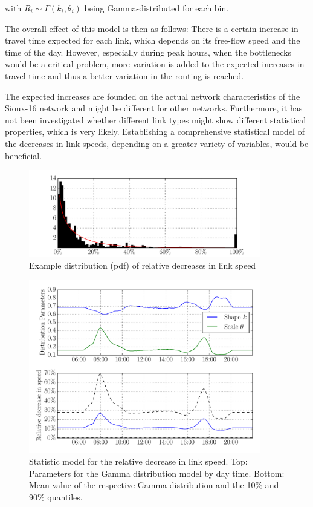 with $R_i \sim \Gamma(k_i, \theta_i)$ being Gamma-distributed for each bin.

The overall effect of this model is then as follows: There is a certain increase
in travel time expected for each link, which depends on its free-flow speed and the time
of the day. However, especially during peak hours, when the bottlenecks would be a
critical problem, more variation is added to the expected increases in travel time
and thus a better variation in the routing is reached.

The expected increases are founded on the actual network characteristics of the Sioux-16 network
and might be different for other networks. Furthermore, it has not been investigated
whether different link types might show different statistical properties, which
is very likely. Establishing a comprehensive statistical model of the decreases
in link speeds, depending on a greater variety of variables, would be beneficial.

\begin{figure}
    \centering
    \includegraphics[width=0.9\textwidth]{figures/speeddecdist.pdf}
    \caption{Example distribution (pdf) of relative decreases in link speed}
    \label{fig:speeddecdist}
\end{figure}

\begin{figure}
    \centering
    \includegraphics[width=0.9\textwidth]{figures/randommodel.pdf}
    \caption{Statistic model for the relative decrease in link speed. Top: Parameters
    for the Gamma distribution model by day time. Bottom: Mean value of the respective
    Gamma distribution and the 10\% and 90\% quantiles.}
    \label{fig:randommodel}
\end{figure}

